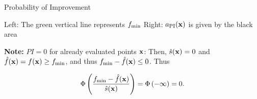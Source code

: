 \documentclass[11pt,compress,t,notes=noshow, xcolor=table]{beamer}
\begin{document}
\begin{frame}{Probability of Improvement}
{\begin{footnotesize}
Left: The green vertical line represents $f_{\min}$ Right: $a_{\text{PI}}(\mathbf{x})$ is given by the black area
\end{footnotesize}
}


 {
\vspace{1em}
\textbf{Note:} $PI=0$ for already evaluated points $\mathbf{x}$: Then, $\hat{s}(\mathbf{x}) = 0$ and $\hat{f}(\mathbf{x}) = f(\mathbf{x}) \ge f_{\min}$, and thus $f_{\min} - \hat{f}(\mathbf{x}) \le 0$. Thus

$$
  \Phi\left(\frac{f_{\min} - \hat{f}(\mathbf{x})}{\hat{s}(\mathbf{x})}\right) = \Phi\left(- \infty\right) = 0.
$$

}

\end{frame}
\end{document}
